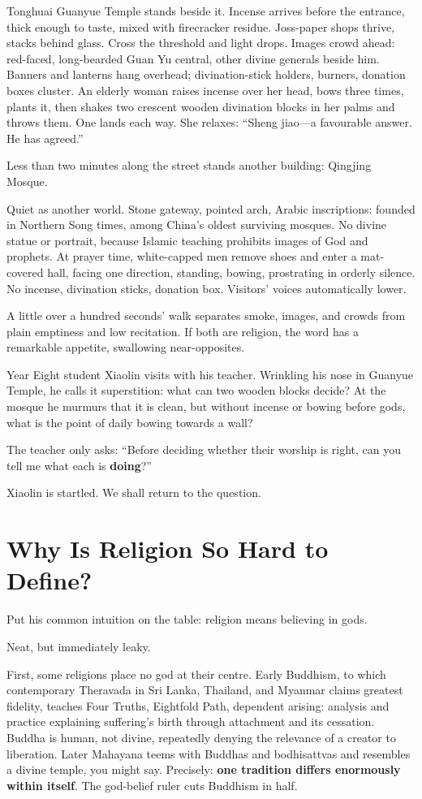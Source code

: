 Tonghuai Guanyue Temple stands beside it. Incense arrives before the entrance, thick enough to taste, mixed with firecracker residue. Joss-paper shops thrive, stacks behind glass. Cross the threshold and light drops. Images crowd ahead: red-faced, long-bearded Guan Yu central, other divine generals beside him. Banners and lanterns hang overhead; divination-stick holders, burners, donation boxes cluster. An elderly woman raises incense over her head, bows three times, plants it, then shakes two crescent wooden divination blocks in her palms and throws them. One lands each way. She relaxes: ``Sheng jiao---a favourable answer. He has agreed.''

Less than two minutes along the street stands another building: Qingjing Mosque.

Quiet as another world. Stone gateway, pointed arch, Arabic inscriptions: founded in Northern Song times, among China's oldest surviving mosques. No divine statue or portrait, because Islamic teaching prohibits images of God and prophets. At prayer time, white-capped men remove shoes and enter a mat-covered hall, facing one direction, standing, bowing, prostrating in orderly silence. No incense, divination sticks, donation box. Visitors' voices automatically lower.

A little over a hundred seconds' walk separates smoke, images, and crowds from plain emptiness and low recitation. If both are religion, the word has a remarkable appetite, swallowing near-opposites.

Year Eight student Xiaolin visits with his teacher. Wrinkling his nose in Guanyue Temple, he calls it superstition: what can two wooden blocks decide? At the mosque he murmurs that it is clean, but without incense or bowing before gods, what is the point of daily bowing towards a wall?

The teacher only asks: ``Before deciding whether their worship is right, can you tell me what each is \textbf{doing}?''

Xiaolin is startled. We shall return to the question.

\section{Why Is Religion So Hard to Define?}
Put his common intuition on the table: religion means believing in gods.

Neat, but immediately leaky.

First, some religions place no god at their centre. Early Buddhism, to which contemporary Theravada in Sri Lanka, Thailand, and Myanmar claims greatest fidelity, teaches Four Truths, Eightfold Path, dependent arising: analysis and practice explaining suffering's birth through attachment and its cessation. Buddha is human, not divine, repeatedly denying the relevance of a creator to liberation. Later Mahayana teems with Buddhas and bodhisattvas and resembles a divine temple, you might say. Precisely: \textbf{one tradition differs enormously within itself}. The god-belief ruler cuts Buddhism in half.

